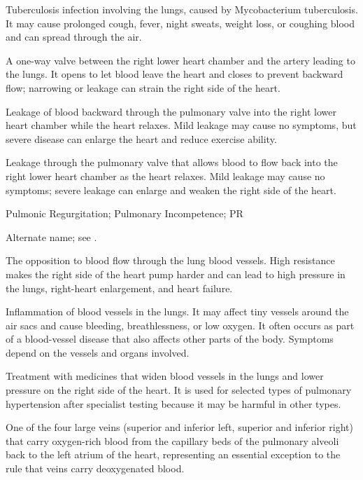 Tuberculosis infection involving the lungs, caused by Mycobacterium tuberculosis. It may cause prolonged cough, fever, night sweats, weight loss, or coughing blood and can spread through the air.

 A one-way valve between the right lower heart chamber and the artery leading to the lungs. It opens to let blood leave the heart and closes to prevent backward flow; narrowing or leakage can strain the right side of the heart.

 Leakage of blood backward through the pulmonary valve into the right lower heart chamber while the heart relaxes. Mild leakage may cause no symptoms, but severe disease can enlarge the heart and reduce exercise ability.

 Leakage through the pulmonary valve that allows blood to flow back into the right lower heart chamber as the heart relaxes. Mild leakage may cause no symptoms; severe leakage can enlarge and weaken the right side of the heart.

\synonyms
Pulmonic Regurgitation; Pulmonary Incompetence; PR

 Alternate name; see .

 The opposition to blood flow through the lung blood vessels. High resistance makes the right side of the heart pump harder and can lead to high pressure in the lungs, right-heart enlargement, and heart failure.

 Inflammation of blood vessels in the lungs. It may
affect tiny vessels around the air sacs and cause bleeding, breathlessness, or low
oxygen. It often occurs as part of a blood-vessel disease that also affects other
parts of the body. Symptoms depend on the vessels and organs involved.

 Treatment with medicines that widen blood vessels in the lungs and lower pressure on the right side of the heart. It is used for selected types of pulmonary hypertension after specialist testing because it may be harmful in other types.

 One of the four large veins (superior and inferior left, superior and inferior right) that carry oxygen-rich blood from the capillary beds of the pulmonary alveoli back to the left atrium of the heart, representing an essential exception to the rule that veins carry deoxygenated blood.

